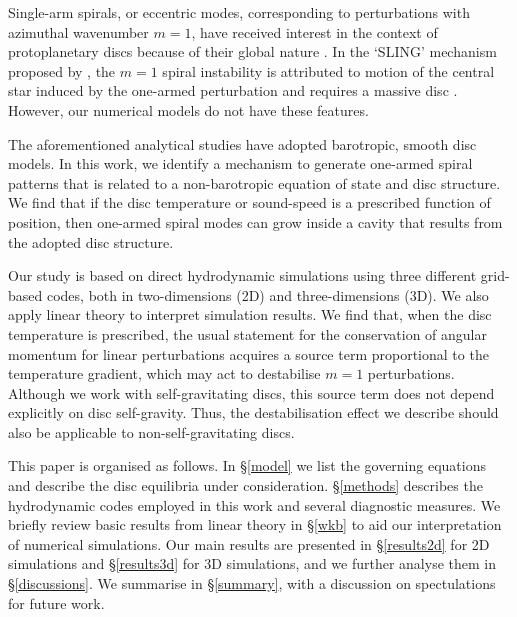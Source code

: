 \documentclass[useAMS,usenatbib]{mn2e}
\begin{document}
Single-arm spirals, or eccentric modes, corresponding to perturbations 
with azimuthal wavenumber $m=1$, have received interest in
the context of protoplanetary discs because of their global nature
\citep{adams89,heemskerk92,laughlin96,tremaine01,papaloizou02,hopkins10}. 
In the `SLING' mechanism proposed by \cite{shu90}, the $m=1$ spiral
instability is attributed to motion of the central star induced by the
one-armed perturbation and requires a massive disc \citep[the former may
have observable consequences, ][]{michael10}. However, our numerical
models do not have these features.   


The aforementioned analytical studies have adopted barotropic, smooth disc models. 
In this work, we identify a mechanism to generate one-armed
spiral patterns that is related to a non-barotropic equation of
state and disc structure. We find that if the disc temperature or
sound-speed is a prescribed function of position, then 
one-armed spiral modes can grow inside a cavity that results from the
adopted disc structure. 

Our study is based on direct hydrodynamic simulations using three
different grid-based codes, both in two-dimensions (2D) and
three-dimensions (3D). We also apply linear
theory to interpret simulation results. We find that, when the disc
temperature is prescribed, the usual statement for the conservation of
angular momentum for linear perturbations acquires a source term
proportional to the temperature gradient, which may act to destabilise
$m=1$ perturbations. Although we work with self-gravitating discs,
this source term does not depend explicitly on disc self-gravity. Thus, the
destabilisation effect we describe should also be applicable to
non-self-gravitating discs. 

This paper is organised as follows. In \S\ref{model} we list the
governing equations and describe the disc equilibria under
consideration. \S\ref{methods} describes the hydrodynamic codes
employed in this work and several diagnostic measures. We briefly
review basic results from linear theory in \S\ref{wkb} to aid our
interpretation of numerical simulations.  Our main results are presented in 
\S\ref{results2d} for 2D simulations and \S\ref{results3d} for 3D
simulations, and we further analyse them in \S\ref{discussions}. 
We summarise in \S\ref{summary}, with a discussion on
spectulations for future work. 











\appendix

\end{document}
